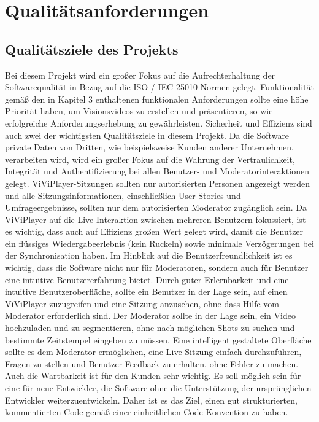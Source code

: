 \section{Qualitätsanforderungen}

	\subsection{Qualitätsziele des Projekts}
	
	Bei diesem Projekt wird ein großer Fokus auf die Aufrechterhaltung der Softwarequalität in Bezug auf die ISO / IEC 25010-Normen gelegt. 
    \linebreak
    Funktionalität gemäß den in Kapitel 3 enthaltenen funktionalen Anforderungen sollte eine höhe Priorität haben, um Visionsvideos zu erstellen und präsentieren, so wie erfolgreiche Anforderungserhebung zu gewährleisten.
    \linebreak
    Sicherheit und Effizienz sind auch zwei der wichtigsten Qualitätsziele in diesem Projekt. Da die Software private Daten von Dritten, wie beispielsweise Kunden anderer Unternehmen, verarbeiten wird, wird ein großer Fokus auf die Wahrung der Vertraulichkeit, Integrität und Authentifizierung bei allen Benutzer- und Moderatorinteraktionen gelegt. ViViPlayer-Sitzungen sollten nur autorisierten Personen angezeigt werden und alle Sitzungsinformationen, einschließlich User Stories und Umfrageergebnisse, sollten nur dem autorisierten Moderator zugänglich sein. 
    \linebreak
    Da ViViPlayer auf die Live-Interaktion zwischen mehreren Benutzern fokussiert, ist es wichtig, dass auch auf Effizienz großen Wert gelegt wird, damit die Benutzer ein flüssiges Wiedergabeerlebnis (kein Ruckeln) sowie minimale Verzögerungen bei der Synchronisation haben.
    \linebreak
    Im Hinblick auf die Benutzerfreundlichkeit ist es wichtig, dass die Software nicht nur für Moderatoren, sondern auch für Benutzer eine intuitive Benutzererfahrung bietet. Durch guter Erlernbarkeit und eine intuitive Benutzeroberfläche, sollte ein Benutzer in der Lage sein, auf einen ViViPlayer zuzugreifen und eine Sitzung anzusehen, ohne dass Hilfe vom Moderator erforderlich sind. Der Moderator sollte in der Lage sein, ein Video hochzuladen und zu segmentieren, ohne nach möglichen Shots zu suchen und bestimmte Zeitstempel eingeben zu müssen. Eine intelligent gestaltete Oberfläche sollte es dem Moderator ermöglichen, eine Live-Sitzung einfach durchzuführen,  Fragen zu stellen und Benutzer-Feedback zu erhalten, ohne Fehler zu machen.
    \linebreak
    \linebreak
    Auch die Wartbarkeit ist für den Kunden sehr wichtig. Es soll möglich sein für eine für neue Entwickler, die Software ohne die Unterstützung der ursprünglichen Entwickler weiterzuentwickeln. Daher ist es das Ziel, einen gut strukturierten, kommentierten Code gemäß einer einheitlichen Code-Konvention zu haben.
    \linebreak
	
